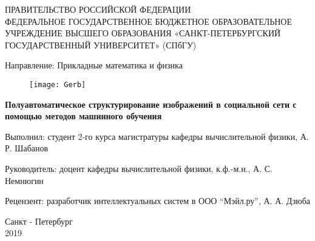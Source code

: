 \begin{titlepage}
		
\thispagestyle{empty}
		
  \begin{center}
  
   
   ПРАВИТЕЛЬСТВО РОССИЙСКОЙ ФЕДЕРАЦИИ \\
   
   \vspace{0.25cm}
   ФЕДЕРАЛЬНОЕ ГОСУДАРСТВЕННОЕ БЮДЖЕТНОЕ
   ОБРАЗОВАТЕЛЬНОЕ УЧРЕЖДЕНИЕ ВЫСШЕГО ОБРАЗОВАНИЯ 
   «САНКТ-ПЕТЕРБУРГСКИЙ ГОСУДАРСТВЕННЫЙ УНИВЕРСИТЕТ» 
   (СПбГУ)
   
   \vspace{0.25cm}
   Направление: Прикладные математика и физика
   
 
   \begin{figure}[h!]
   	\begin{center}
   		\texttt{[image: Gerb]}
   	\end{center}
   \end{figure}


     \textbf{\Large Полуавтоматическое структурирование
     изображений в социальной сети с помощью 
     методов машинного обучения}
     
 \bigskip

\vfill

\begin{flushright}
    \footnotesize{
    Выполнил: студент 2-го курса магистратуры кафедры вычислительной физики, А. Р. Шабанов
    
    Руководитель: доцент кафедры вычислительной физики, к.ф.-м.н., А. С. Немнюгин
    
    Рецензент: разработчик интеллектуальных систем в ООО “Мэйл.ру”, А. А. Дзюба
    }
\end{flushright}

\end{center}

\vfill

\newlength{\ML}


\begin{center}
    Санкт - Петербург \\
    2019
\end{center}

\end{titlepage}
